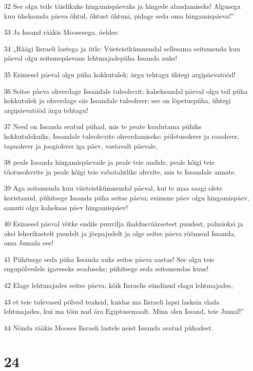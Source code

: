 \par 32 See olgu teile täielikuks hingamispäevaks ja hingede alandamiseks! Algusega kuu üheksanda päeva õhtul, õhtust õhtuni, pidage seda oma hingamispäeva!”
\par 33 Ja Issand rääkis Moosesega, öeldes:
\par 34 „Räägi Iisraeli lastega ja ütle: Viieteistkümnendal sellesama seitsmenda kuu päeval olgu seitsmepäevane lehtmajadepüha Issanda auks!
\par 35 Esimesel päeval olgu püha kokkutulek; ärgu tehtagu ühtegi argipäevatööd!
\par 36 Seitse päeva ohverdage Issandale tuleohvrit; kaheksandal päeval olgu teil püha kokkutulek ja ohverdage siis Issandale tuleohver; see on lõpetuspüha, ühtegi argipäevatööd ärgu tehtagu!
\par 37 Need on Issanda seatud pühad, mis te peate kuulutama pühiks kokkutulekuiks, Issandale tuleohvrite ohverdamiseks: põletusohver ja roaohver, tapaohver ja joogiohver iga päev, vastavalt päevale,
\par 38 peale Issanda hingamispäevade ja peale teie andide, peale kõigi teie tõotusohvrite ja peale kõigi teie vabatahtlike ohvrite, mis te Issandale annate.
\par 39 Aga seitsmenda kuu viieteistkümnendal päeval, kui te maa saagi olete koristanud, pühitsege Issanda püha seitse päeva; esimene päev olgu hingamispäev, samuti olgu kaheksas päev hingamispäev!
\par 40 Esimesel päeval võtke endile puuvilja ihaldusväärsetest puudest, palmioksi ja oksi leherikastelt puudelt ja jõepajudelt ja olge seitse päeva rõõmsad Issanda, oma Jumala ees!
\par 41 Pühitsege seda püha Issanda auks seitse päeva aastas! See olgu teie sugupõlvedele igaveseks seaduseks; pühitsege seda seitsmendas kuus!
\par 42 Elage lehtmajades seitse päeva; kõik Iisraelis sündinud elagu lehtmajades,
\par 43 et teie tulevased põlved teaksid, kuidas ma Iisraeli lapsi lasksin elada lehtmajades, kui ma tõin nad ära Egiptusemaalt. Mina olen Issand, teie Jumal!”
\par 44 Nõnda rääkis Mooses Iisraeli lastele neist Issanda seatud pühadest.

\chapter{24}

